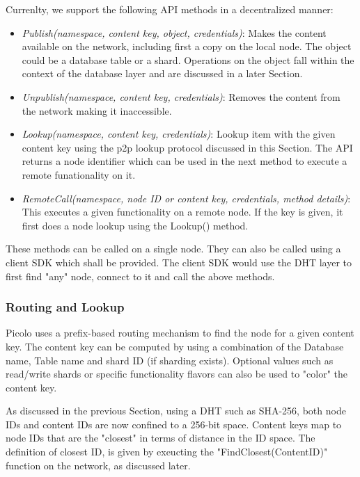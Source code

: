 Currenlty, we support the following API methods in a decentralized manner:
\begin{itemize}
    \item {\em Publish(namespace, content key, object, credentials)}: Makes the content available on the network, including first a copy on
        the local node. The object could be a database table or a shard. Operations on the object fall within the
        context of the database layer and are discussed in a later Section.
    \item {\em Unpublish(namespace, content key, credentials)}: Removes the content from the network making it inaccessible.
    \item {\em Lookup(namespace, content key, credentials)}: Lookup item with the given content key using the p2p lookup protocol
        discussed in this Section. The API returns a node identifier which can be used in the next method to execute a
        remote funationality on it.
    \item {\em RemoteCall(namespace, node ID or content key, credentials, method details)}: This executes a given functionality
        on a remote node. If the key is given, it first does a node lookup using the Lookup() method.
\end{itemize}

These methods can be called on a single node. They can also be called using a client SDK which shall be provided. The
client SDK would use the DHT layer to first find "any" node, connect to it and call the above methods.

\subsubsection{Routing and Lookup}
\label{net:routing}

Picolo uses a prefix-based routing mechanism to find the node for a given content key. The content key can be computed
by using a combination of the Database name, Table name and shard ID (if sharding exists). Optional values such as
read/write shards or specific functionality flavors can also be used to "color" the content key.

As discussed in the previous Section, using a DHT such as SHA-256, both node IDs and content IDs are now confined to a
256-bit space. Content keys map to node IDs that are the "closest" in terms of distance in the ID space. The definition
of closest ID, is given by exeucting the "FindClosest(ContentID)" function on the network, as discussed later.

